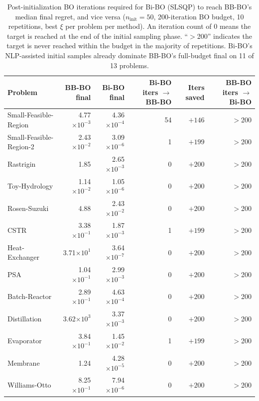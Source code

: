 \documentclass[12pt,a4paper]{article}%
\theoremstyle{plain}%
\theoremstyle{remark}%
\theoremstyle{definition}%
\begin{document}
\begin{appendices}
\begin{table}[htbp]
\centering
\caption{Post-initialization BO iterations required for Bi-BO (SLSQP) to reach BB-BO's median final regret, and vice versa ($n_\text{init}=50$, 200-iteration BO budget, 10 repetitions, best $\xi$ per problem per method). An iteration count of $0$ means the target is reached at the end of the initial sampling phase. ``$>$200'' indicates the target is never reached within the budget in the majority of repetitions. Bi-BO's NLP-assisted initial samples already dominate BB-BO's full-budget final on 11 of 13 problems.}
\label{tab:convergence_iterations}
\begin{tabular}{@{}lrrrrr@{}}
\toprule
\textbf{Problem} & \textbf{BB-BO final} & \textbf{Bi-BO final} & \textbf{Bi-BO iters $\to$ BB-BO} & \textbf{Iters saved} & \textbf{BB-BO iters $\to$ Bi-BO} \\
\midrule
Small-Feasible-Region   & 4.77$\times 10^{-3}$ & 4.36$\times 10^{-4}$ & 54 & $+146$ & $>$200 \\
Small-Feasible-Region-2 & 2.43$\times 10^{-2}$ & 3.09$\times 10^{-6}$ & 1  & $+199$ & $>$200 \\
Rastrigin               & 1.85                 & 2.65$\times 10^{-3}$ & 0  & $+200$ & $>$200 \\
Toy-Hydrology           & 1.14$\times 10^{-2}$ & 1.05$\times 10^{-6}$ & 0  & $+200$ & $>$200 \\
Rosen-Suzuki            & 4.88                 & 2.43$\times 10^{-2}$ & 0  & $+200$ & $>$200 \\
CSTR                    & 3.38$\times 10^{-1}$ & 1.87$\times 10^{-3}$ & 1  & $+199$ & $>$200 \\
Heat-Exchanger          & 3.71$\times 10^{1}$  & 3.64$\times 10^{-7}$ & 0  & $+200$ & $>$200 \\
PSA                     & 1.04$\times 10^{-1}$ & 2.99$\times 10^{-3}$ & 0  & $+200$ & $>$200 \\
Batch-Reactor           & 2.89$\times 10^{-1}$ & 4.63$\times 10^{-4}$ & 0  & $+200$ & $>$200 \\
Distillation            & 3.62$\times 10^{3}$  & 3.37$\times 10^{-3}$ & 0  & $+200$ & $>$200 \\
Evaporator              & 3.84$\times 10^{-1}$ & 1.45$\times 10^{-2}$ & 1  & $+199$ & $>$200 \\
Membrane                & 1.24                 & 4.28$\times 10^{-5}$ & 0  & $+200$ & $>$200 \\
Williams-Otto           & 8.25$\times 10^{-1}$ & 7.94$\times 10^{-6}$ & 0  & $+200$ & $>$200 \\
\bottomrule
\end{tabular}
\end{table}


\end{appendices}
\end{document}
